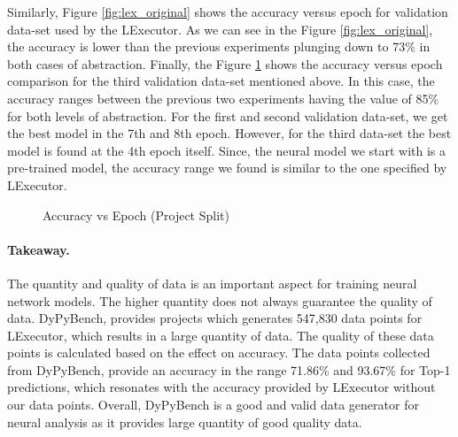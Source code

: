 Similarly, Figure \ref{fig:lex_original} shows the accuracy versus epoch for validation data-set used by the LExecutor.
As we can see in the Figure \ref{fig:lex_original}, the accuracy is lower than the previous experiments plunging down to 73\% in both cases of abstraction.
Finally, the Figure \ref{fig:lex_project} shows the accuracy versus epoch comparison for the third validation data-set mentioned above.
In this case, the accuracy ranges between the previous two experiments having the value of 85\% for both levels of abstraction.
For the first and second validation data-set, we get the best model in the 7th and 8th epoch.
However, for the third data-set the best model is found at the 4th epoch itself.
Since, the neural model we start with is a pre-trained model, the accuracy range we found is similar to the one specified by LExecutor.
\begin{figure}[ht]
    \centering
    \caption[Accuracy vs Epoch (Project Split)]{\label{fig:lex_project}Accuracy vs Epoch (Project Split) }
\end{figure}

\paragraph{Takeaway.} The quantity and quality of data is an important aspect for training neural network models. The higher quantity does not always guarantee the quality of data.
DyPyBench, provides projects which generates 547,830 data points for LExecutor, which results in a large quantity of data.
The quality of these data points is calculated based on the effect on accuracy.
The data points collected from DyPyBench, provide an accuracy in the range 71.86\% and 93.67\% for Top-1 predictions, which resonates with the accuracy provided by LExecutor without our data points.
Overall, DyPyBench is a good and valid data generator for neural analysis as it provides large quantity of good quality data.   

